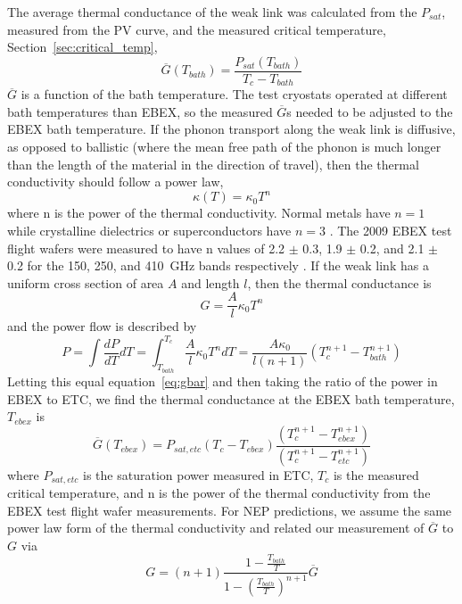 The average thermal conductance of the weak link was calculated from the $P_{sat}$, measured from the PV curve, and the measured critical temperature, Section~\ref{sec:critical_temp}, 
\begin{equation}
\overline{G}(T_{bath}) = \frac{P_{sat}(T_{bath})}{T_{c} - T_{bath}}
\end{equation}
$\overline{G}$ is a function of the bath temperature. 
The test cryostats operated at different bath temperatures than \ac{EBEX}, so the measured $\overline{G}$s needed to be adjusted to the \ac{EBEX} bath temperature. 
If the phonon transport along the weak link is diffusive, as opposed to ballistic (where the mean free path of the phonon is much longer than the length of the material in the direction of travel), then the thermal conductivity should follow a power law, 
\begin{equation}
\kappa \left( T \right) = \kappa_0 T^n
\end{equation}
where n is the power of the thermal conductivity. 
Normal metals have $n=1$ while crystalline dielectrics or superconductors have $n=3$ \cite{Mather1982}. 
The 2009 \ac{EBEX} test flight wafers were measured to have n values of 2.2 $\pm$ 0.3, 1.9 $\pm$ 0.2, and 2.1 $\pm$ 0.2 for the 150, 250, and 410~GHz bands respectively \cite{Hubmayr2009}.
If the weak link has a uniform cross section of area $A$ and length $l$, then the thermal conductance is 
\begin{equation}
G = \frac{A}{l} \kappa_0 T^n
\end{equation}
and the power flow is described by
\begin{equation}
P = \int \frac{dP}{dT} dT = \int_{T_{bath}}^{T_c} \frac{A}{l} \kappa_0 T^n dT = \frac{A\kappa_0}{l(n+1)} \left( T_c^{n+1} - T_{bath}^{n+1} \right)
\label{eq:power_int}
\end{equation}
Letting this equal equation~\ref{eq:gbar} and then taking the ratio of the power in \ac{EBEX} to \ac{ETC}, we find the thermal conductance at the \ac{EBEX} bath temperature, $T_{ebex}$ is
\begin{equation}
\overline{G} \left( T_{ebex} \right) = P_{sat, etc} \left( T_c - T_{ebex} \right) \frac{\left( T_c^{n+1} - T_{ebex}^{n+1} \right)}{\left( T_c^{n+1} - T_{etc}^{n+1} \right)}
\end{equation}
where $P_{sat,etc}$ is the saturation power measured in \ac{ETC}, $T_c$ is the measured critical temperature, and n is the power of the thermal conductivity from the \ac{EBEX} test flight wafer measurements. 
For \ac{NEP} predictions, we assume the same power law form of the thermal conductivity and related our measurement of $\overline G$ to $G$ via \cite{Lee1998}
\begin{equation}
G = (n + 1) \frac{1-\frac{T_{bath}}{T}}{1-\left(\frac{T_{bath}}{T}\right)^{n+1}} \overline{G}
\end{equation}


